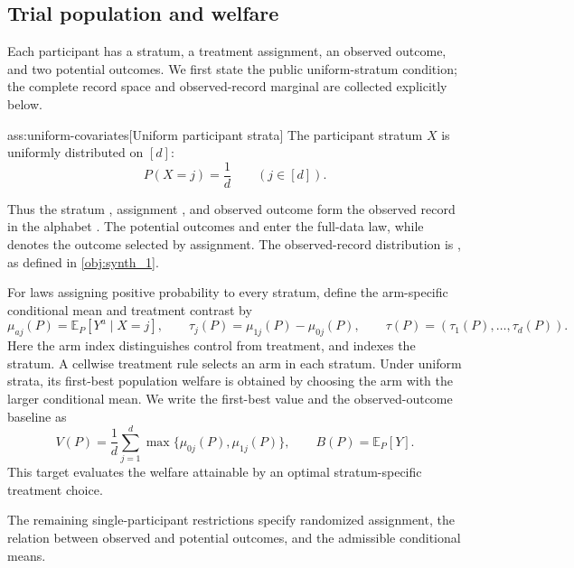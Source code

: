 \documentclass[11pt]{article}
\begin{document}
\subsection{Trial population and welfare}

Each participant has a stratum, a treatment assignment, an observed outcome, and two potential outcomes. We first state the public uniform-stratum condition; the complete record space and observed-record marginal are collected explicitly below.

\begin{assumptionv}{ass:uniform-covariates}[Uniform participant strata]
The participant stratum \(X\) is uniformly distributed on \([d]\):
\[
P(X=j)=\frac{1}{d}\qquad(j\in[d]).
\]
\end{assumptionv}

Thus the stratum , assignment , and observed outcome  form the observed record  in the alphabet . The potential outcomes  and  enter the full-data law, while  denotes the outcome selected by assignment. The observed-record distribution is , as defined in \cref{obj:synth_1}.

For laws assigning positive probability to every stratum, define the arm-specific conditional mean  and treatment contrast  by
\[
\mu_{aj}(P)=\mathbb E_P[Y^a\mid X=j],
\qquad
\tau_j(P)=\mu_{1j}(P)-\mu_{0j}(P),
\qquad
\tau(P)=(\tau_1(P),\ldots,\tau_d(P)).
\]
Here the arm index  distinguishes control from treatment, and  indexes the stratum. A cellwise treatment rule selects an arm in each stratum. Under uniform strata, its first-best population welfare is obtained by choosing the arm with the larger conditional mean. We write the first-best value  and the observed-outcome baseline  as
\[
V(P)=\frac1d\sum_{j=1}^d\max\{\mu_{0j}(P),\mu_{1j}(P)\},
\qquad
B(P)=\mathbb E_P[Y].
\]
This target evaluates the welfare attainable by an optimal stratum-specific treatment choice.

The remaining single-participant restrictions specify randomized assignment, the relation between observed and potential outcomes, and the admissible conditional means.
\end{document}
